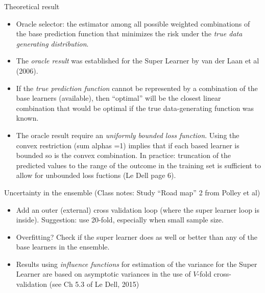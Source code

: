 \documentclass[
  ignorenonframetext,
]{beamer}
\providecommand{\tightlist}{%
  \setlength{\itemsep}{0pt}\setlength{\parskip}{0pt}}
\begin{document}
\begin{frame}
\begin{block}{Theoretical result}
\protect\hypertarget{theoretical-result}{}
\begin{itemize}
\tightlist
\item
  Oracle selector: the estimator among all possible weighted
  combinations of the base prediction function that minimizes the risk
  under the \emph{true data generating distribution}.
\item
  The \emph{oracle result} was established for the Super Learner by van
  der Laan et al (2006).
\item
  If the \emph{true prediction function} cannot be represented by a
  combination of the base learners (available), then ``optimal'' will be
  the closest linear combination that would be optimal if the true
  data-generating function was known.
\item
  The oracle result require an \emph{uniformly bounded loss function}.
  Using the convex restriction (sum alphas =1) implies that if each
  based learner is bounded so is the convex combination. In practice:
  truncation of the predicted values to the range of the outcome in the
  training set is sufficient to allow for unbounded loss fuctions (Le
  Dell page 6).
\end{itemize}
\end{block}
\end{frame}

\begin{frame}
\begin{block}{Uncertainty in the ensemble}
\protect\hypertarget{uncertainty-in-the-ensemble}{}
(Class notes: Study ``Road map'' 2 from Polley et al)

\begin{itemize}
\tightlist
\item
  Add an outer (external) cross validation loop (where the super learner
  loop is inside). Suggestion: use 20-fold, especially when small sample
  size.
\item
  Overfitting? Check if the super learner does as well or better than
  any of the base learners in the ensemble.
\item
  Results using \emph{influence functions} for estimation of the
  variance for the Super Learner are based on asymptotic variances in
  the use of \(V\)-fold cross-validation (see Ch 5.3 of Le Dell, 2015)
\end{itemize}
\end{block}
\end{frame}
\end{document}
